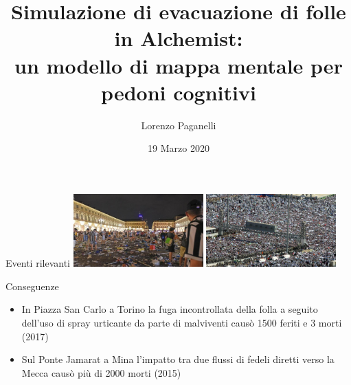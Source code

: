 \documentclass{beamer}
\title[Navigazione cognitiva in Alchemist]{
    Simulazione di evacuazione di folle in Alchemist: \\
    un modello di mappa mentale per pedoni cognitivi
}
\author{Lorenzo Paganelli}
\institute[]
{
    Alma Mater Studiorum $\cdot$ Università di Bologna\\
    Campus di Cesena%
}
\date{19 Marzo 2020}
\begin{document}
\begin{frame}
  \titlepage
\end{frame}



\begin{frame}{Eventi rilevanti}
\hfil\hfil\includegraphics[width=5cm]{figures/piazza-san-carlo.jpeg}
\hfil\hfil\includegraphics[width=5cm]{figures/hajj.jpg}
\newline
\null
\hfil\hfil{}
\hfil\hfil{}
\begin{block}{Conseguenze}
\begin{itemize}
    \item In Piazza San Carlo a Torino la fuga incontrollata della folla a seguito dell'uso di spray urticante da parte di malviventi causò 1500 feriti e 3 morti (2017)
    \item Sul Ponte Jamarat a Mina l'impatto tra due flussi di fedeli diretti verso la Mecca causò più di 2000 morti (2015)
\end{itemize}
\end{block}
\end{frame}
\end{document}
